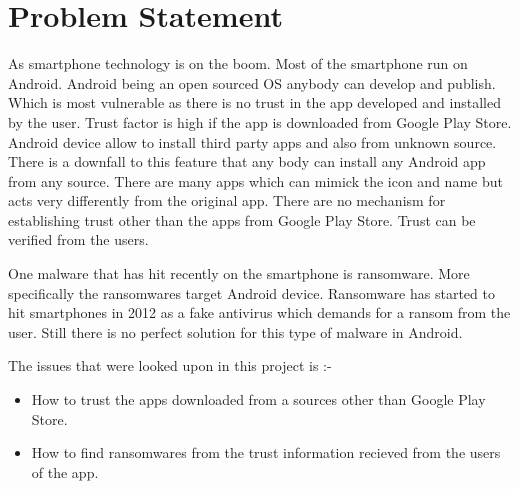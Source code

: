 \chapter{Problem Statement}

As smartphone technology is on the boom. 
Most of the smartphone run on Android.
Android being an open sourced OS anybody can develop and publish.
Which is most vulnerable as there is no trust in the app developed and installed by the user.
Trust factor is high if the app is downloaded from Google Play Store.
Android device allow to install third party apps and also from unknown source.
There is a downfall to this feature that any body can install any Android app from any source.
There are many apps which can mimick the icon and name but acts very differently from the original app.
There are no mechanism for establishing trust other than the apps from Google Play Store.
Trust can be verified from the users.


\par One malware that has hit recently on the smartphone is ransomware.
More specifically the ransomwares target Android device.
Ransomware has started to hit smartphones in 2012 as a fake antivirus which demands for a ransom from the user.
Still there is no perfect solution for this type of malware in Android.

\par The issues that were looked upon in this project is :-
\begin{itemize}
    \item How to trust the apps downloaded from a sources other than Google Play Store.  
    \item How to find ransomwares from the trust information recieved from the users of the app.
\end{itemize}